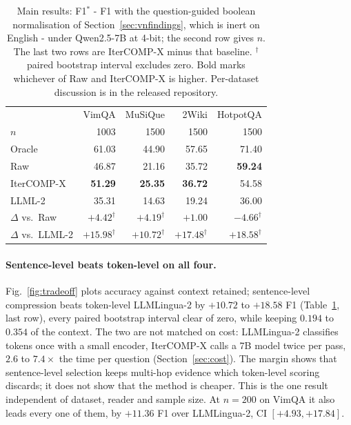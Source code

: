 \documentclass{llncs}
\begin{document}
\begin{table}[tbp]
\centering
\caption{Main results: F1$^*$ - F1 with the question-guided boolean
normalisation of Section~\ref{sec:vnfindings}, which is inert on English -
under Qwen2.5-7B at 4-bit; the second row gives $n$. The
last two rows are IterCOMP-X minus that baseline. $^\dag$ paired bootstrap interval
excludes zero. Bold marks whichever of Raw and IterCOMP-X is higher.
Per-dataset discussion is in the released repository.}
\label{tab:4ds}
\footnotesize
\setlength{\tabcolsep}{2.4pt}
\begin{tabular}{lrrrr}
\toprule
& VimQA & MuSiQue & 2Wiki & HotpotQA \\
$n$ & 1003 & 1500 & 1500 & 1500 \\
\midrule
Oracle & 61.03 & 44.90 & 57.65 & 71.40 \\
Raw & 46.87 & 21.16 & 35.72 & \textbf{59.24} \\
IterCOMP-X & \textbf{51.29} & \textbf{25.35} & \textbf{36.72} & 54.58 \\
LLML-2 & 35.31 & 14.63 & 19.24 & 36.00 \\
\midrule
$\Delta$ vs.\ Raw & $+4.42^\dag$ & $+4.19^\dag$ & $+1.00$ & $-4.66^\dag$ \\
$\Delta$ vs.\ LLML-2 & $+15.98^\dag$ & $+10.72^\dag$ & $+17.48^\dag$ & $+18.58^\dag$ \\
\bottomrule
\end{tabular}
\end{table}

\paragraph{Sentence-level beats token-level on all four.} Fig.~\ref{fig:tradeoff} plots
accuracy against context retained; sentence-level compression beats
token-level LLMLingua-2 by $+10.72$ to $+18.58$ F1 (Table~\ref{tab:4ds}, last
row), every paired bootstrap interval clear of zero, while keeping $0.194$ to
$0.354$ of the context. The two are not matched on cost:
LLMLingua-2 classifies tokens once with a small encoder, IterCOMP-X calls a 7B
model twice per pass, $2.6$ to $7.4\times$ the time per question
(Section~\ref{sec:cost}). The margin shows that sentence-level selection keeps multi-hop
evidence which token-level scoring discards; it does not show that the method is
cheaper. This is the
one result independent of dataset, reader and sample size. At $n=200$ on VimQA it
also leads every one of them, by $+11.36$ F1 over LLMLingua-2, CI
$[+4.93,+17.84]$.
\end{document}
